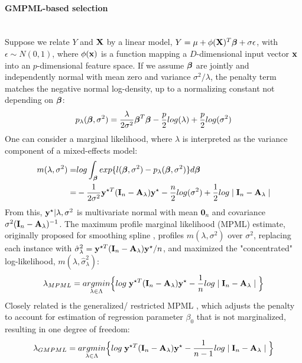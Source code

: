 \documentclass[11pt]{article}
\begin{document}
\paragraph{GMPML-based selection}\mbox{}\\
Suppose we relate $Y$ and ${\bf X}$ by a linear model, $Y=\mu+\phi({\bf X})^T\boldsymbol{\beta}+\sigma \epsilon$, with $\epsilon \sim N(0, 1)$, where $\phi({\bf x})$ is a function mapping a $D$-dimensional input vector ${\bf x}$ into an $p$-dimensional feature space. If we assume $\boldsymbol{\beta}$ are jointly and independently normal with mean zero and variance $\sigma^2/\lambda$, the penalty term matches the negative normal log-density, up to a normalizing constant not depending on $\boldsymbol{\beta}$:
\begin{align*}
p_\lambda(\boldsymbol{\beta}, \sigma^2)=\frac{\lambda}{2\sigma^2}\boldsymbol{\beta}^T\boldsymbol{\beta}-\frac{p}{2}log(\lambda)+\frac{p}{2}log(\sigma^2)
\end{align*}
One can consider a marginal likelihood, where $\lambda$ is interpreted as the variance component of a mixed-effects model:
\begin{align*}
m(\lambda, \sigma^2)=&log \int_{\boldsymbol{\beta}} exp\{ l(\boldsymbol{\beta}, \sigma^2)-p_\lambda(\boldsymbol{\beta}, \sigma^2)\}d\boldsymbol{\beta} \\=&-\frac{1}{2\sigma^2}{\bf y}^{\star T}({\bf I}_n-{\bf A}_\lambda){\bf y}^\star-\frac{n}{2}log(\sigma^2)+\frac{1}{2}log \mid {\bf I}_n-{\bf A}_\lambda \mid
\end{align*}
From this, ${\bf y}^\star |\lambda, \sigma^2$ is multivariate normal with mean $\mathbf{0}_n$ and covariance $\sigma^2({\bf I}_n-{\bf A}_\lambda)^{-1}$. The maximum profile marginal likelihood (MPML) estimate, originally proposed for smoothing spline \citep{wecker_signal_1983}, profiles $m(\lambda, \sigma^2)$ over $\sigma^2$, replacing each instance with $\hat{\sigma}_\lambda^2={\bf y}^{\star T}({\bf I}_n-{\bf A}_\lambda){\bf y}^\star/n$, and maximized the "concentrated" log-likelihood, $m(\lambda, \hat{\sigma}_\lambda^2)$:
\begin{align*}
\lambda_{MPML}=\underset{\lambda \in \Lambda}{argmin}\Big\{log\; {\bf y}^{\star T}({\bf I}_n-{\bf A}_\lambda){\bf y}^\star-\frac{1}{n}log \mid {\bf I}_n-{\bf A}_\lambda \mid \Big\}
\end{align*}
Closely related is the generalized/ restricted MPML \citep{harville_maximum_1977, wahba_comparison_1985}, which adjusts the penalty to account for estimation of regression parameter $\beta_0$ that is not marginalized, resulting in one degree of freedom:
\begin{align}
\lambda_{GMPML}=\underset{\lambda \in \Lambda}{argmin}\Big\{log\; {\bf y}^{\star T}({\bf I}_n-{\bf A}_\lambda){\bf y}^\star-\frac{1}{n-1}log \mid {\bf I}_n-{\bf A}_\lambda \mid \Big\}
\end{align}
\end{document}
